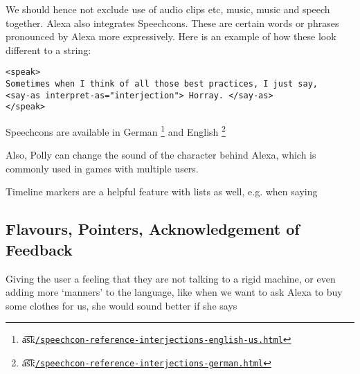 We should hence not exclude use of audio clips etc, music, music and speech together. Alexa also integrates Speechcons. These are certain words or phrases pronounced by Alexa more expressively. Here is an example of how these look different to a string:

\begin{verbatim}
<speak>
Sometimes when I think of all those best practices, I just say,
<say-as interpret-as="interjection"> Horray. </say-as> 
</speak>
\end{verbatim}



\noindent Speechcons are available in German \footnote{\t{a\t{sk}}\href{https://developer.amazon.com/docs/custom-skills/speechcon-reference-interjections-english-us.html}{\lstinline|/speechcon-reference-interjections-english-us.html|}} and English \footnote{\t{a\t{sk}}\href{https://developer.amazon.com/docs/custom-skills/speechcon-reference-interjections-german.html}{\lstinline|/speechcon-reference-interjections-german.html|}}

\noindent Also, Polly can change the sound of the character behind Alexa, which is commonly used in games with multiple users.

\noindent Timeline markers are a helpful feature with lists as well, e.g. when saying 

\begin{flushright}
\end{flushright}





\subsection*{Flavours, Pointers, Acknowledgement of Feedback}
Giving the user a feeling that they are not talking to a rigid machine, or even adding more `manners' to the language, like when we want to ask Alexa to buy some clothes for us, she would sound better if she says 


